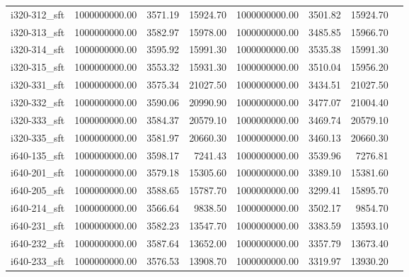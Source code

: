 \begin{tabular}{llrrrrrr}
i320-312\_sft &      1000000000.00 &                3571.19 &         15924.70 &    1000000000.00 &              3501.82 &       15924.70 \\
i320-313\_sft &      1000000000.00 &                3582.97 &         15978.00 &    1000000000.00 &              3485.85 &       15966.70 \\
i320-314\_sft &      1000000000.00 &                3595.92 &         15991.30 &    1000000000.00 &              3535.38 &       15991.30 \\
i320-315\_sft &      1000000000.00 &                3553.32 &         15931.30 &    1000000000.00 &              3510.04 &       15956.20 \\
i320-331\_sft &      1000000000.00 &                3575.34 &         21027.50 &    1000000000.00 &              3434.51 &       21027.50 \\
i320-332\_sft &      1000000000.00 &                3590.06 &         20990.90 &    1000000000.00 &              3477.07 &       21004.40 \\
i320-333\_sft &      1000000000.00 &                3584.37 &         20579.10 &    1000000000.00 &              3469.74 &       20579.10 \\
i320-335\_sft &      1000000000.00 &                3581.97 &         20660.30 &    1000000000.00 &              3460.13 &       20660.30 \\
i640-135\_sft &      1000000000.00 &                3598.17 &          7241.43 &    1000000000.00 &              3539.96 &        7276.81 \\
i640-201\_sft &      1000000000.00 &                3579.18 &         15305.60 &    1000000000.00 &              3389.10 &       15381.60 \\
i640-205\_sft &      1000000000.00 &                3588.65 &         15787.70 &    1000000000.00 &              3299.41 &       15895.70 \\
i640-214\_sft &      1000000000.00 &                3566.64 &          9838.50 &    1000000000.00 &              3502.17 &        9854.70 \\
i640-231\_sft &      1000000000.00 &                3582.23 &         13547.70 &    1000000000.00 &              3383.59 &       13593.10 \\
i640-232\_sft &      1000000000.00 &                3587.64 &         13652.00 &    1000000000.00 &              3357.79 &       13673.40 \\
i640-233\_sft &      1000000000.00 &                3576.53 &         13908.70 &    1000000000.00 &              3319.97 &       13930.20 \\

\end{tabular}
